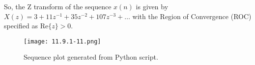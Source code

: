 \documentclass[12pt]{article}
\begin{document}
So, the Z transform of the sequence \(x(n)\) is given by \(X(z) = 3 + 11z^{-1} + 35z^{-2} + 107z^{-3} + \ldots\) with the Region of Convergence (ROC) specified as \(\text{Re}\{z\} > 0\).


\begin{figure}[h]
    \centering
    \texttt{[image: 11.9.1-11.png]}
    \caption{Sequence plot generated from Python script.}
    \label{fig:sequence-plot}
\end{figure}
\end{document}
